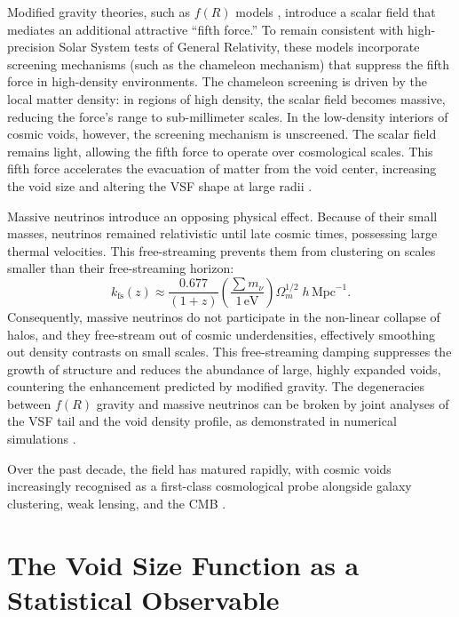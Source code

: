 \documentclass[12pt]{report}
\begin{document}
Modified gravity theories, such as $f(R)$ models \citep{HuSawicki2007}, introduce a scalar field that mediates an additional attractive ``fifth force.'' To remain consistent with high-precision Solar System tests of General Relativity, these models incorporate screening mechanisms (such as the chameleon mechanism) that suppress the fifth force in high-density environments. The chameleon screening is driven by the local matter density: in regions of high density, the scalar field becomes massive, reducing the force's range to sub-millimeter scales. In the low-density interiors of cosmic voids, however, the screening mechanism is unscreened. The scalar field remains light, allowing the fifth force to operate over cosmological scales. This fifth force accelerates the evacuation of matter from the void center, increasing the void size and altering the VSF shape at large radii \citep{Li2012,Contarini2021}.

Massive neutrinos introduce an opposing physical effect. Because of their small masses, neutrinos remained relativistic until late cosmic times, possessing large thermal velocities. This free-streaming prevents them from clustering on scales smaller than their free-streaming horizon:
\begin{equation}
    k_{\mathrm{fs}}(z) \approx \frac{0.677}{(1+z)} \left(\frac{\sum m_\nu}{1\,\mathrm{eV}}\right) \Omega_m^{1/2} \; h\,\mathrm{Mpc}^{-1}.
\end{equation}
Consequently, massive neutrinos do not participate in the non-linear collapse of halos, and they free-stream out of cosmic underdensities, effectively smoothing out density contrasts on small scales. This free-streaming damping suppresses the growth of structure and reduces the abundance of large, highly expanded voids, countering the enhancement predicted by modified gravity. The degeneracies between $f(R)$ gravity and massive neutrinos can be broken by joint analyses of the VSF tail and the void density profile, as demonstrated in numerical simulations \citep{Contarini2021,Sartori2025}.

Over the past decade, the field has matured rapidly, with cosmic voids increasingly recognised as a first-class cosmological probe alongside galaxy clustering, weak lensing, and the CMB \citep{Pisani2019WhitePaper,Moresco2022,Hamaus2023}.


\section{The Void Size Function as a Statistical Observable}
\end{document}
